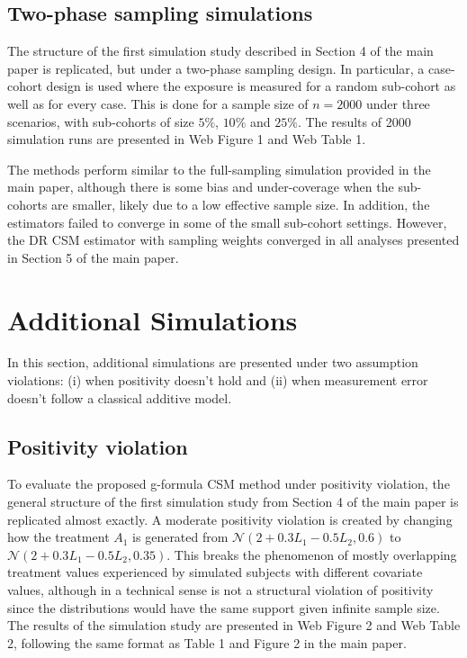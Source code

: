 \documentclass[12pt]{article}
\begin{document}
\subsection{Two-phase sampling simulations}

The structure of the first simulation study described in Section 4 of the main paper is replicated, but under a two-phase sampling design. In particular, a case-cohort design is used where the exposure is measured for a random sub-cohort as well as for every case. This is done for a sample size of $n=2000$ under three scenarios, with sub-cohorts of size $5\%$, $10\%$ and $25\%$. The results of 2000 simulation runs are presented in Web Figure 1 and Web Table 1.

The methods perform similar to the full-sampling simulation provided in the main paper, although there is some bias and under-coverage when the sub-cohorts are smaller, likely due to a low effective sample size. In addition, the estimators failed to converge in some of the small sub-cohort settings. However, the DR CSM estimator with sampling weights converged in all analyses presented in Section 5 of the main paper.

\section{Additional Simulations}

In this section, additional simulations are presented under two assumption violations: (i) when positivity doesn't hold and (ii) when measurement error doesn't follow a classical additive model.

\subsection{Positivity violation}

To evaluate the proposed g-formula CSM method under positivity violation, the general structure of the first simulation study from Section 4 of the main paper is replicated almost exactly. A moderate positivity violation is created by changing how the treatment $A_{1}$ is generated from $\mathcal{N}(2 + 0.3L_{1} - 0.5L_{2}, 0.6)$ to $\mathcal{N}(2 + 0.3L_{1} - 0.5L_{2}, 0.35)$. This breaks the phenomenon of mostly overlapping treatment values experienced by simulated subjects with different covariate values, although in a technical sense is not a structural violation of positivity since the distributions would have the same support given infinite sample size. The results of the simulation study are presented in Web Figure 2 and Web Table 2, following the same format as Table 1 and Figure 2 in the main paper.
\end{document}
